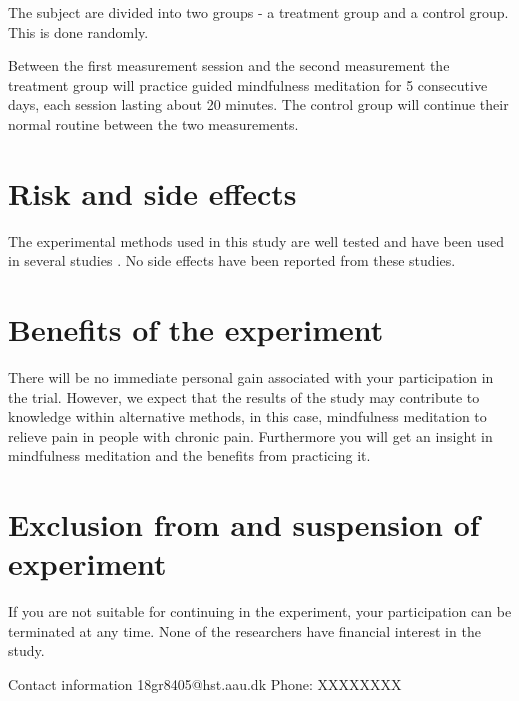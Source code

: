 The subject are divided into two groups - a treatment group and a control group. This is done randomly.

Between the first measurement session and the second measurement the treatment group will practice guided mindfulness meditation for 5 consecutive days, each session lasting about 20 minutes. The control group will continue their normal routine between the two measurements.


\section{Risk and side effects}
The experimental methods used in this study are well tested and have been used in several studies . No side effects have been reported from these studies.


\section{Benefits of the experiment}
There will be no immediate personal gain associated with your participation in the trial. However, we expect that the results of the study may contribute to knowledge within alternative methods, in this case, mindfulness meditation to relieve pain in people with chronic pain. Furthermore you will get an insight in mindfulness meditation and the benefits from practicing it.

\section{Exclusion from and suspension of experiment}
If you are not suitable for continuing in the experiment, your participation can be terminated at any time.
None of the researchers have financial interest in the study.

Contact information
18gr8405@hst.aau.dk
Phone: XXXXXXXX
